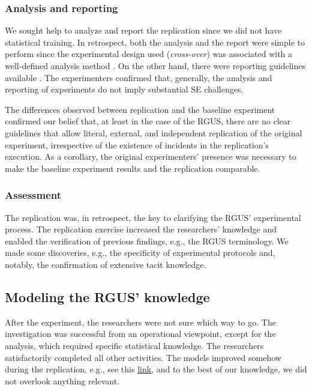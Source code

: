 \subsubsection{Analysis and reporting}
We sought help to analyze and report the replication since we did not have statistical training. In retrospect, both the analysis and the report were simple to perform since the experimental design used (\textit{cross-over}) was associated with a well-defined analysis method \cite{Vegas-2016-crossover-designs-experiments-SE}. On the other hand, there were reporting guidelines available \cite{Carver-2010-guidelines-replication-SE}. The experimenters confirmed that, generally, the analysis and reporting of experiments do not imply substantial SE challenges.

The differences observed between replication and the baseline experiment confirmed our belief that, at least in the case of the RGUS, there are no clear guidelines that allow literal, external, and independent replication \cite{Gomez-2014-understanding-replication} of the original experiment, irrespective of the existence of incidents in the replication's execution. As a corollary, the original experimenters' presence was necessary to make the baseline experiment results and the replication comparable.

\subsubsection{Assessment}
The replication was, in retrospect, the key to clarifying the RGUS' experimental process. The replication exercise increased the researchers' knowledge and enabled the verification of previous findings, e.g., the RGUS terminology. We made some discoveries, e.g., the specificity of experimental protocols and, notably, the confirmation of extensive tacit knowledge.

\subsection{Modeling the RGUS' knowledge}\label{subsec-conocimiento-grupo}
After the experiment, the researchers were not sure which way to go. The investigation was successful from an operational viewpoint, except for the analysis, which required specific statistical knowledge. The researchers satisfactorily completed all other activities. The models improved somehow during the replication, e.g., see this \href{https://zenodo.org/record/7101676#.YytEquzMLUI}{\ul{link}}, and to the best of our knowledge, we did not overlook anything relevant.

